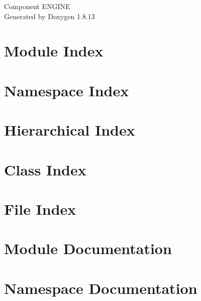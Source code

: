 \documentclass[twoside]{book}
\newcommand{\+}{\discretionary{\mbox{\scriptsize$\hookleftarrow$}}{}{}}
\newcommand{\clearemptydoublepage}{%
  \newpage{\pagestyle{empty}\cleardoublepage}%
}
\begin{document}
\hypersetup{pageanchor=false,
             bookmarksnumbered=true,
             pdfencoding=unicode
            }
\begin{titlepage}
\vspace*{7cm}
\begin{center}%
{\Large Component E\+N\+G\+I\+NE }\\
\vspace*{1cm}
{\large Generated by Doxygen 1.8.13}\\
\end{center}
\end{titlepage}
\clearemptydoublepage
{}
\tableofcontents
\clearemptydoublepage
{}
\hypersetup{pageanchor=true}

\chapter{Module Index}

\chapter{Namespace Index}

\chapter{Hierarchical Index}

\chapter{Class Index}

\chapter{File Index}

\chapter{Module Documentation}


\chapter{Namespace Documentation}




\end{document}
